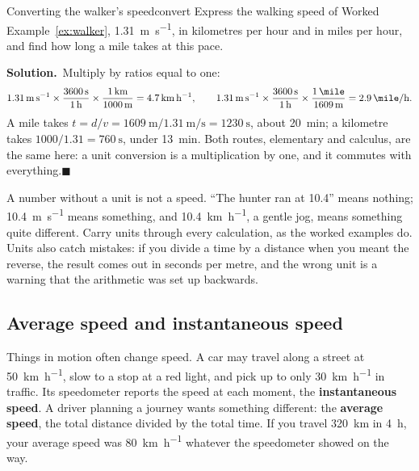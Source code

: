 \documentclass[11pt,twoside,openany]{book}
\newcommand{\solution}{\par\smallskip\noindent\textbf{Solution.}\ }
\newcommand{\qed}{\hfill$\blacksquare$}
\begin{document}
\begin{example}{Converting the walker's speed}{convert}
Express the walking speed of Worked Example~\ref{ex:walker}, \SI{1.31}{\metre\per\second}, in kilometres per hour and in miles per hour, and find how long a mile takes at this pace.

\solution Multiply by ratios equal to one:
\[
\SI{1.31}{\metre\per\second} \times \frac{\SI{3600}{\second}}{\SI{1}{\hour}} \times \frac{\SI{1}{\kilo\metre}}{\SI{1000}{\metre}} = \SI{4.7}{\kilo\metre\per\hour},
\qquad
\SI{1.31}{\metre\per\second} \times \frac{\SI{3600}{\second}}{\SI{1}{\hour}} \times \frac{\SI{1}{\mile}}{\SI{1609}{\metre}} = \SI{2.9}{\mile\per\hour}.
\]
A mile takes $t = d/v = \SI{1609}{\metre}/\SI{1.31}{\metre\per\second} = \SI{1230}{\second}$, about \SI{20}{\minute}; a kilometre takes $1000/1.31 = \SI{760}{\second}$, under \SI{13}{\minute}. Both routes, elementary and calculus, are the same here: a unit conversion is a multiplication by one, and it commutes with everything.\qed
\end{example}

\begin{modelnote}
A number without a unit is not a speed. ``The hunter ran at \num{10.4}'' means nothing; \SI{10.4}{\metre\per\second} means something, and \SI{10.4}{\kilo\metre\per\hour}, a gentle jog, means something quite different. Carry units through every calculation, as the worked examples do. Units also catch mistakes: if you divide a time by a distance when you meant the reverse, the result comes out in seconds per metre, and the wrong unit is a warning that the arithmetic was set up backwards.
\end{modelnote}

\subsection{Average speed and instantaneous speed}
\label{sec:avginst}

Things in motion often change speed. A car may travel along a street at \SI{50}{\kilo\metre\per\hour}, slow to a stop at a red light, and pick up to only \SI{30}{\kilo\metre\per\hour} in traffic. Its speedometer reports the speed at each moment, the \textbf{instantaneous speed}. A driver planning a journey wants something different: the \textbf{average speed}, the total distance divided by the total time. If you travel \SI{320}{\kilo\metre} in \SI{4}{\hour}, your average speed was \SI{80}{\kilo\metre\per\hour} whatever the speedometer showed on the way.
\end{document}
